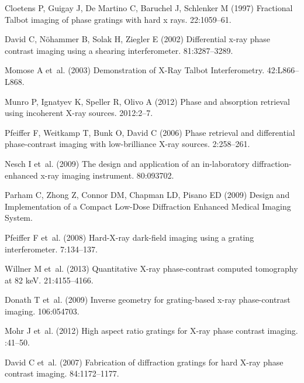 \documentclass{pnastwo}
\begin{document}
\begin{article}
\begin{thebibliography}{10}
Cloetens P, Guigay J, {De Martino} C, Baruchel J, Schlenker M (1997)
  {Fractional Talbot imaging of phase gratings with hard x rays.}
 22:1059--61.

David C, N\"{o}hammer B, Solak H, Ziegler E (2002) {Differential x-ray phase
  contrast imaging using a shearing interferometer}.
 81:3287--3289.

Momose A et~al. (2003) {Demonstration of X-Ray Talbot Interferometry}.
 42:L866--L868.

Munro P, Ignatyev K, Speller R, Olivo A (2012) {Phase and absorption retrieval
  using incoherent X-ray sources}.
 2012:2--7.

Pfeiffer F, Weitkamp T, Bunk O, David C (2006) {Phase retrieval and
  differential phase-contrast imaging with low-brilliance X-ray sources}.
 2:258--261.

Nesch I et~al. (2009) {The design and application of an in-laboratory
  diffraction-enhanced x-ray imaging instrument.}
 80:093702.

Parham C, Zhong Z, Connor DM, Chapman LD, Pisano ED (2009) {Design and
  Implementation of a Compact Low-Dose Diffraction Enhanced Medical Imaging
  System}.

Pfeiffer F et~al. (2008) {Hard-X-ray dark-field imaging using a grating
  interferometer}.
 7:134--137.

Willner M et~al. (2013) {Quantitative X-ray phase-contrast computed tomography
  at 82 keV}.
 21:4155--4166.

Donath T et~al. (2009) {Inverse geometry for grating-based x-ray phase-contrast
  imaging}.
 106:054703.

Mohr J et~al. (2012) {High aspect ratio gratings for X-ray phase contrast
  imaging}.
:41--50.

David C et~al. (2007) {Fabrication of diffraction gratings for hard X-ray phase
  contrast imaging}.
 84:1172--1177.


\end{thebibliography}
\end{article}
\end{document}
